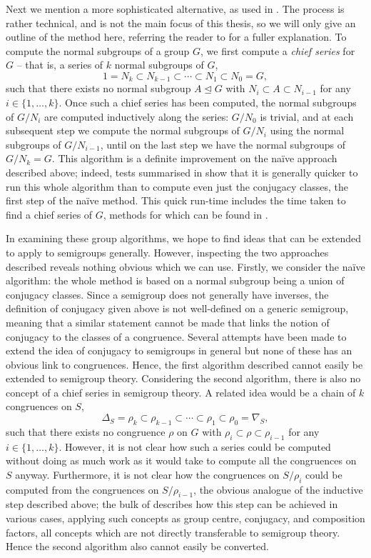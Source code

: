 Next we mention a more sophisticated alternative, as used in \GAP{}.  The process
is rather technical, and is not the main focus of this thesis, so we will only
give an outline of the method here, referring the reader to \cite{hulpke_1998}
for a fuller explanation.  To compute the normal subgroups of a group $G$, we
first compute a \textit{chief series} for $G$ -- that is, a series of $k$ normal
subgroups of $G$, 
$$1 = N_k
\subset N_{k-1}
\subset \cdots
\subset N_1
\subset N_0 = G,$$
such that there exists no normal subgroup $A \trianglelefteq G$ with
$N_i \subset A \subset N_{i-1}$ for any $i \in \{1, \ldots, k\}$.
Once such a chief series has been computed, the normal subgroups of $G / N_i$
are computed inductively along the series: $G / N_0$ is trivial, and at each
subsequent step we compute the normal subgroups of $G / N_i$ using the normal
subgroups of $G / N_{i-1}$, until on the last step we have the normal subgroups
of $G / N_k = G$.  This algorithm is a definite improvement on the na\"ive
approach described above; indeed, tests summarised in \cite[Table
1]{hulpke_1998} show that it is generally quicker to run this whole algorithm
than to compute even just the conjugacy classes, the first step of the na\"ive
method.  This quick run-time includes the time taken to find a chief series of
$G$, methods for which can be found in \cite{chief_series}.

In examining these group algorithms, we hope to find ideas that can be extended
to apply to semigroups generally.  However, inspecting the two approaches
described reveals nothing obvious which we can use.  Firstly, we consider the
na\"ive algorithm: the whole method is based on a normal subgroup being a union
of conjugacy classes.  Since a semigroup does not generally have inverses, the
definition of conjugacy given above is not well-defined on a generic semigroup,
meaning that a similar statement cannot be made that links the notion of
conjugacy to the classes of a congruence.  Several attempts have been made to
extend the idea of conjugacy to semigroups in general
\cite{conjugation_in_semigroups} but none of these has an obvious link to
congruences.  Hence, the first algorithm described cannot easily be extended to
semigroup theory.  Considering the second algorithm, there is also no concept of
a chief series in semigroup theory.  A related idea would be a chain of $k$
congruences on $S$,
$$\Delta_S = \rho_k
\subset \rho_{k-1}
\subset \cdots
\subset \rho_1
\subset \rho_0 = \nabla_S,$$
such that there exists no congruence $\rho$ on $G$ with
$\rho_i \subset \rho \subset \rho_{i-1}$ for any $i \in \{1, \ldots, k\}$.
However, it is not clear how such a series could be computed without doing as
much work as it would take to compute all the congruences on $S$ anyway.
Furthermore, it is not clear how the congruences on $S / \rho_i$ could be
computed from the congruences on $S / \rho_{i-1}$, the obvious analogue of the
inductive step described above; the bulk of \cite{hulpke_1998} describes how
this step can be achieved in various cases, applying such concepts as group
centre, conjugacy, and composition factors, all
concepts which are not directly transferable to semigroup theory.  Hence the
second algorithm also cannot easily be converted.


